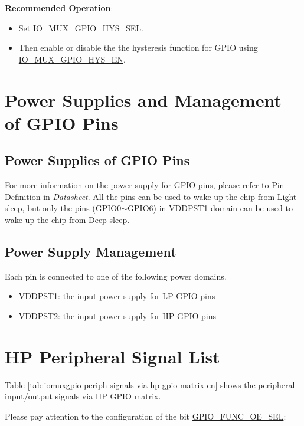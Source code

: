 \documentclass[main\_\_EN.tex]{subfiles}
\begin{document}
\textbf{Recommended Operation}:\\
\begin{itemize}
    \item Set \hyperref[fielddesc:IOMUXGPIONHYSSEL]{IO\_MUX\_GPIO\_HYS\_SEL}.
    \item Then enable or disable the the hysteresis function for GPIO using \hyperref[fielddesc:IOMUXGPIONHYSEN]{IO\_MUX\_GPIO\_HYS\_EN}.
\end{itemize}


\section{Power Supplies and Management of GPIO Pins}

\subsection{Power Supplies of GPIO Pins}
For more information on the power supply for GPIO pins, please refer to Pin Definition in {\textit{\href{https://www.espressif.com/sites/default/files/documentation/esp32-c61_datasheet_en.pdf}{\chipname{} Datasheet}}}. All the pins can be used to wake up the chip from Light-sleep, but only the pins (GPIO0$\sim$GPIO6) in VDDPST1 domain can be used to wake up the chip from Deep-sleep.

\subsection{Power Supply Management}

Each \chipname{} pin is connected to one of the following power domains.

\begin{itemize}
    \item VDDPST1: the input power supply for LP GPIO pins
    \item VDDPST2: the input power supply for HP GPIO pins
\end{itemize}

\section{HP Peripheral Signal List}

Table \ref{tab:iomuxgpio-periph-signals-via-hp-gpio-matrix-en} shows the peripheral input/output signals via HP GPIO matrix.

Please pay attention to the configuration of the bit \hyperref[fielddesc:GPIOFUNCNOESEL]{GPIO\_FUNC\_OE\_SEL}:
\end{document}
